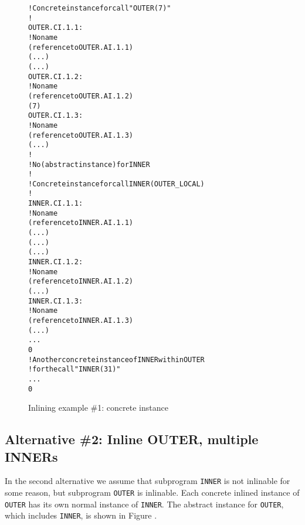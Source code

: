 \begin{figure}[p]
\begin{dwflisting}
\begin{alltt}
! Concrete instance for call "OUTER(7)"
! 
OUTER.CI.1.1:
    \DWTAGinlinedsubroutine
        ! No name
        \DWATabstractorigin(reference to OUTER.AI.1.1)
        \DWATlowpc(...)
        \DWAThighpc(...)
OUTER.CI.1.2:
        \DWTAGformalparameter
            ! No name
            \DWATabstractorigin(reference to OUTER.AI.1.2)
            \DWATconstvalue(7)
OUTER.CI.1.3:
        \DWTAGvariable
            ! No name
            \DWATabstractorigin(reference to OUTER.AI.1.3)
            \DWATlocation(...)
        !
        ! No \DWTAGsubprogram (abstract instance) for INNER
        !
        ! Concrete instance for call INNER(OUTER\_LOCAL)
        !
INNER.CI.1.1:
        \DWTAGinlinedsubroutine
            ! No name
            \DWATabstractorigin(reference to INNER.AI.1.1)
            \DWATlowpc(...)
            \DWAThighpc(...)
            \DWATstaticlink(...)
INNER.CI.1.2:
            \DWTAGformalparameter
                ! No name
                \DWATabstractorigin(reference to INNER.AI.1.2)
                \DWATlocation(...)
INNER.CI.1.3:
            \DWTAGvariable
                ! No name
                \DWATabstractorigin(reference to INNER.AI.1.3)
                \DWATlocation(...)
            ...
            0
        ! Another concrete instance of INNER within OUTER
        ! for the call "INNER(31)"
        ...
        0
\end{alltt}
\end{dwflisting}
\caption{Inlining example \#1: concrete instance}
\label{fig:inliningexample1concreteinstance}
\end{figure}

\subsection{Alternative \#2: Inline OUTER, multiple INNERs}
\label{app:inlineoutermultiipleinners}


In the second alternative we assume that subprogram \texttt{INNER}
is not inlinable for some reason, but subprogram \texttt{OUTER} is
inlinable. 
Each concrete inlined instance of \texttt{OUTER} has its
own normal instance of \texttt{INNER}. 
The abstract instance for \texttt{OUTER},
which includes \texttt{INNER}, is shown in 
Figure .

